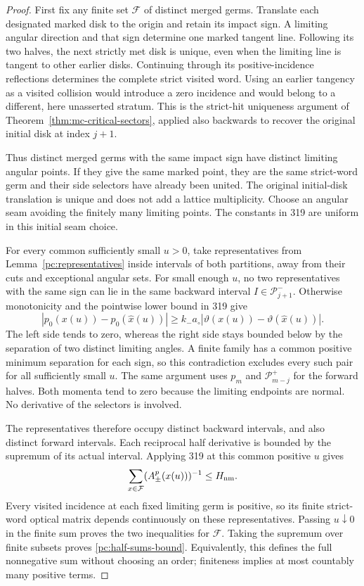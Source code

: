 \begin{proof}
First fix any finite set $\mathcal F$ of distinct merged germs.
Translate each designated marked disk to the origin and retain its
impact sign. A limiting angular direction and that sign determine
one marked tangent line. Following its two halves, the next strictly
met disk is unique, even when the limiting line is tangent to other
earlier disks. Continuing through its positive-incidence reflections
determines the complete strict visited word. Using an earlier
tangency as a visited collision would introduce a zero incidence
and would belong to a different, here unasserted stratum.
This is the strict-hit uniqueness argument of
Theorem~\ref{thm:mc-critical-sectors}, applied also backwards to
recover the original initial disk at index $j+1$.

Thus distinct merged germs with the same impact sign have distinct
limiting angular points. If they give the same marked point, they
are the same strict-word germ and their side selectors have already
been united. The original initial-disk translation is unique and
does not add a lattice multiplicity. Choose an angular seam avoiding
the finitely many limiting points. The constants in 319 are uniform
in this initial seam choice.

For every common sufficiently small $u>0$, take representatives
from Lemma~\ref{pc:representatives} inside intervals of both partitions, away from their cuts and
exceptional angular sets. For small enough $u$, no two representatives with the
same sign can lie in the same backward interval
$I\in\mathcal P^-_{j+1}$. Otherwise monotonicity and the pointwise
lower bound in 319 give
\[
 |p_0(x(u))-p_0(\widehat x(u))|
       \ge k_-a_\circ
                  |\vartheta(x(u))-\vartheta(\widehat x(u))|.
\]
The left side tends to zero, whereas the right side stays bounded
below by the separation of two distinct limiting angles.
A finite family has a common positive minimum separation for
each sign, so this contradiction excludes every such pair for
all sufficiently small $u$. The same argument uses $p_m$ and
$\mathcal P^+_{m-j}$ for the forward halves. Both momenta tend to
zero because the limiting endpoints are normal. No derivative of
the selectors is involved.

The representatives therefore occupy distinct backward intervals,
and also distinct forward intervals. Each reciprocal half derivative
is bounded by the supremum of its actual interval. Applying 319
at this common positive $u$ gives
\[
 \sum_{x\in\mathcal F}(A_\pm^p(x(u)))^{-1}\le H_{\rm nm}.
\]
Every visited incidence at each fixed limiting germ is positive,
so its finite strict-word optical matrix depends continuously on
these representatives. Passing $u\downarrow0$ in the finite sum
proves the two inequalities for $\mathcal F$. Taking the supremum
over finite subsets proves \eqref{pc:half-sums-bound}. Equivalently, this
defines the full nonnegative sum without choosing an order; finiteness
implies at most countably many positive terms.


\end{proof}
